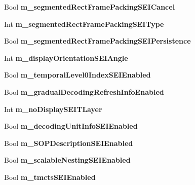 \begin{DoxyCompactItemize}
Bool {\bfseries m\+\_\+segmented\+Rect\+Frame\+Packing\+S\+E\+I\+Cancel}
\item 
\mbox{\label{class_t_enc_cfg_af24d8a3e8b789eb599b992655e0f9ab8}} 
Int {\bfseries m\+\_\+segmented\+Rect\+Frame\+Packing\+S\+E\+I\+Type}
\item 
\mbox{\label{class_t_enc_cfg_aa9136f473f694eeda068121ef24638e0}} 
Bool {\bfseries m\+\_\+segmented\+Rect\+Frame\+Packing\+S\+E\+I\+Persistence}
\item 
\mbox{\label{class_t_enc_cfg_a1d644031823c5245ecb622eae74c47b9}} 
Int {\bfseries m\+\_\+display\+Orientation\+S\+E\+I\+Angle}
\item 
\mbox{\label{class_t_enc_cfg_a32c5f5b5b9fa00c6fc3600744f4a2489}} 
Bool {\bfseries m\+\_\+temporal\+Level0\+Index\+S\+E\+I\+Enabled}
\item 
\mbox{\label{class_t_enc_cfg_a1f741d1d887c7f501444893e41cd5552}} 
Bool {\bfseries m\+\_\+gradual\+Decoding\+Refresh\+Info\+Enabled}
\item 
\mbox{\label{class_t_enc_cfg_a84e9bca1f081ce84b3fb0eece0b5f9ab}} 
Int {\bfseries m\+\_\+no\+Display\+S\+E\+I\+T\+Layer}
\item 
\mbox{\label{class_t_enc_cfg_a5ee55f0f49d07d59fe82296438264d7e}} 
Bool {\bfseries m\+\_\+decoding\+Unit\+Info\+S\+E\+I\+Enabled}
\item 
\mbox{\label{class_t_enc_cfg_aa4314fecfe2d19b96b506f56094d8067}} 
Bool {\bfseries m\+\_\+\+S\+O\+P\+Description\+S\+E\+I\+Enabled}
\item 
\mbox{\label{class_t_enc_cfg_afcc3caa91f03fb11e2fd3f79be17a545}} 
Bool {\bfseries m\+\_\+scalable\+Nesting\+S\+E\+I\+Enabled}
\item 
\mbox{\label{class_t_enc_cfg_a75c1d7628b229961770a6dab0b877bf1}} 
Bool {\bfseries m\+\_\+tmcts\+S\+E\+I\+Enabled}
\item 
\mbox{\label{class_t_enc_cfg_a3a27cf288dfb07ac977467122fd66149}} 

\end{DoxyCompactItemize}

